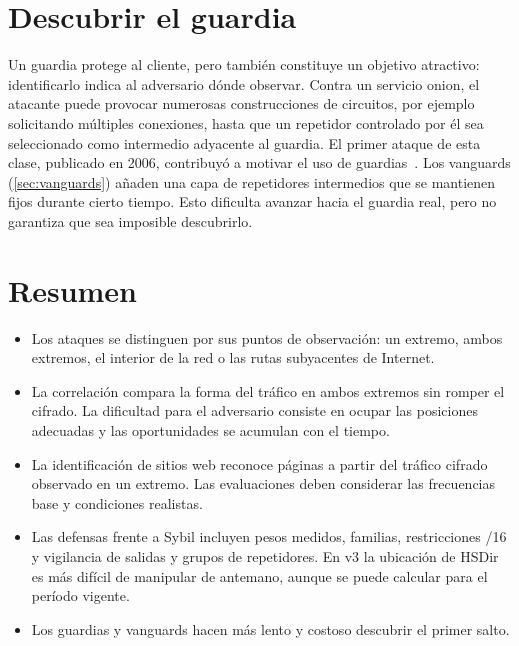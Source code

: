 \section{Descubrir el guardia}\label{sec:att-guard}

Un guardia protege al cliente, pero también constituye un objetivo atractivo: identificarlo indica al adversario dónde observar. Contra un servicio onion, el atacante puede provocar numerosas construcciones de circuitos, por ejemplo solicitando múltiples conexiones, hasta que un repetidor controlado por él sea seleccionado como intermedio adyacente al guardia. El primer ataque de esta clase, publicado en 2006, contribuyó a motivar el uso de guardias~\cite{overlier2006locating}. Los vanguards (\cref{sec:vanguards}) añaden una capa de repetidores intermedios que se mantienen fijos durante cierto tiempo. Esto dificulta avanzar hacia el guardia real, pero no garantiza que sea imposible descubrirlo.

\section*{Resumen}
\begin{itemize}
  \item Los ataques se distinguen por sus puntos de observación: un extremo, ambos extremos, el interior de la red o las rutas subyacentes de Internet.
  \item La correlación compara la forma del tráfico en ambos extremos sin romper el cifrado. La dificultad para el adversario consiste en ocupar las posiciones adecuadas y las oportunidades se acumulan con el tiempo.
  \item La identificación de sitios web reconoce páginas a partir del tráfico cifrado observado en un extremo. Las evaluaciones deben considerar las frecuencias base y condiciones realistas.
  \item Las defensas frente a Sybil incluyen pesos medidos, familias, restricciones /16 y vigilancia de salidas y grupos de repetidores. En v3 la ubicación de HSDir es más difícil de manipular de antemano, aunque se puede calcular para el período vigente.
  \item Los guardias y vanguards hacen más lento y costoso descubrir el primer salto.
\end{itemize}

